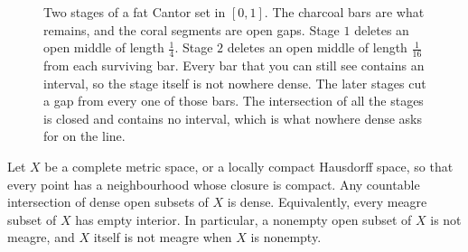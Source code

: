 \begin{figure}[ht]
\centering
{}
\caption{Two stages of a fat Cantor set in $[0,1]$. The charcoal bars are what remains, and the coral segments are open gaps. Stage $1$ deletes an open middle of length $\frac14$. Stage $2$ deletes an open middle of length $\frac1{16}$ from each surviving bar. Every bar that you can still see contains an interval, so the stage itself is not nowhere dense. The later stages cut a gap from every one of those bars. The intersection of all the stages is closed and contains no interval, which is what nowhere dense asks for on the line.}
\label{fig:rwfatcantor}
\end{figure}

\begin{theorem}[Baire, 1899]\label{thm:baire}
Let $X$ be a complete metric space, or a locally compact Hausdorff space, so that every point has a neighbourhood whose closure is compact. Any countable intersection of dense open subsets of $X$ is dense. Equivalently, every meagre subset of $X$ has empty interior. In particular, a nonempty open subset of $X$ is not meagre, and $X$ itself is not meagre when $X$ is nonempty.
\end{theorem}
